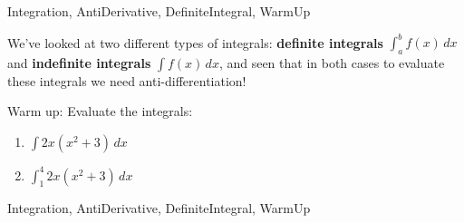 
\begin{tagblock}{Integration, AntiDerivative, DefiniteIntegral, WarmUp}
\begin{question}

We've looked at two different types of integrals: \textbf{definite integrals} $\int_a^b f(x) \, dx$ and \textbf{indefinite integrals} $\int f(x) \, dx$, and seen that in both cases to evaluate these integrals we need anti-differentiation!


Warm up:  Evaluate the integrals:
\begin{enumerate} 
\item $\displaystyle \int 2x(x^2+3) \, dx$
\vspace{1in}

\item $\displaystyle \int_1^4 2x(x^2+3) \, dx$
\vspace{1in}

\end{enumerate}






	
	
\begin{tags}
	  Integration, AntiDerivative, DefiniteIntegral, WarmUp
\end{tags}
	
\begin{diary}
	   
\end{diary}
	
\begin{solution}
	   
	    \end{enumerate}
\end{solution}
	
\end{question}

\end{tagblock}

